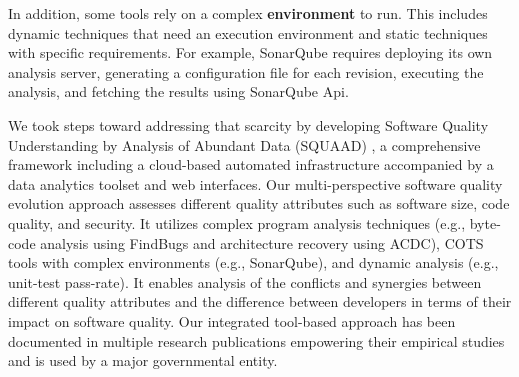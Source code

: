 In addition, some tools rely on a complex \textbf{environment} to run.
This includes dynamic techniques that need an execution environment and static techniques with specific requirements.
For example, SonarQube \cite{campbellsonarqube} requires deploying its own analysis server, generating a configuration file for each revision, executing the analysis, and fetching the results using SonarQube Api.

We took steps toward addressing that scarcity by developing Software Quality Understanding by Analysis of Abundant Data (SQUAAD) \cite{cser2018behnamghader}, a comprehensive framework including a cloud-based automated infrastructure accompanied by a data analytics toolset and web interfaces.
Our multi-perspective software quality evolution approach assesses
different quality attributes such as software size, code quality, and security.
It utilizes complex program analysis techniques (e.g., byte-code analysis using FindBugs and architecture recovery using ACDC), COTS tools with complex environments (e.g., SonarQube), and dynamic analysis (e.g., unit-test pass-rate).
It enables analysis of the conflicts and synergies between different quality attributes and the difference between developers in terms of their impact on software quality.
Our integrated tool-based approach has been documented in multiple research publications \cite{cser2018behnamghader,Behnamghader2018esem,Behnamghader2017qrs,Behnamghader2017,Alfayez2017stc, Alfayez2018TechDebt} empowering their empirical studies and is used by a major governmental entity.


